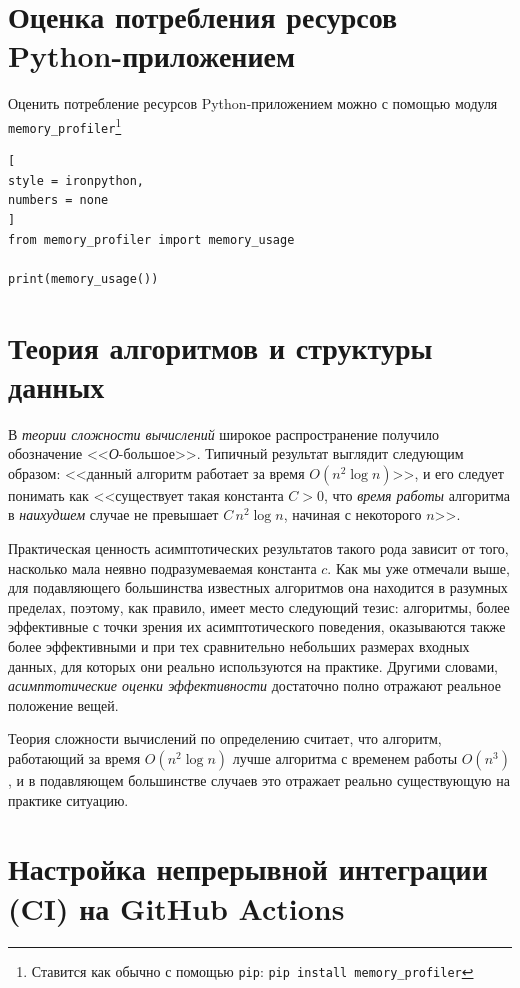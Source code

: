 \documentclass[%
	11pt,
	a4paper,
	utf8,
		]{article}
\begin{document}
\section{Оценка потребления ресурсов Python-приложением}

Оценить потребление ресурсов Python-приложением можно с помощью модуля \texttt{memory\_profiler}\footnote{Ставится как обычно с помощью \texttt{pip}: \texttt{pip install memory\_profiler}}
\begin{lstlisting}[
style = ironpython,
numbers = none
]
from memory_profiler import memory_usage

print(memory_usage())
\end{lstlisting}

\section{Теория алгоритмов и структуры данных}

В \emph{теории сложности вычислений} широкое распространение получило обозначение <<\emph{О}-большое>>. Типичный результат выглядит следующим образом: <<данный алгоритм работает за время $ O(n^2 \log n) $>>, и его следует понимать как <<существует такая константа $ C > 0 $, что \emph{время работы} алгоритма в \emph{наихудшем} случае не превышает $ C\,n^2 \log n $, начиная с некоторого $ n $>>.

Практическая ценность асимптотических результатов такого рода зависит от того, насколько мала неявно подразумеваемая константа $ c $. Как мы уже отмечали выше, для подавляющего большинства известных алгоритмов она находится в разумных пределах, поэтому, как правило, имеет место следующий тезис: алгоритмы, более эффективные с точки зрения их асимптотического поведения, оказываются также более эффективными и при тех сравнительно небольших размерах входных данных, для которых они реально используются на практике. Другими словами, \emph{асимптотические оценки эффективности} достаточно полно отражают реальное положение вещей.

Теория сложности вычислений по определению считает, что алгоритм, работающий за время $ O(n^2 \log n) $ лучше алгоритма с временем работы $ O(n^3) $, и в подавляющем большинстве случаев это отражает реально существующую на практике ситуацию.

\section{Настройка непрерывной интеграции (CI) на GitHub Actions}
\end{document}
